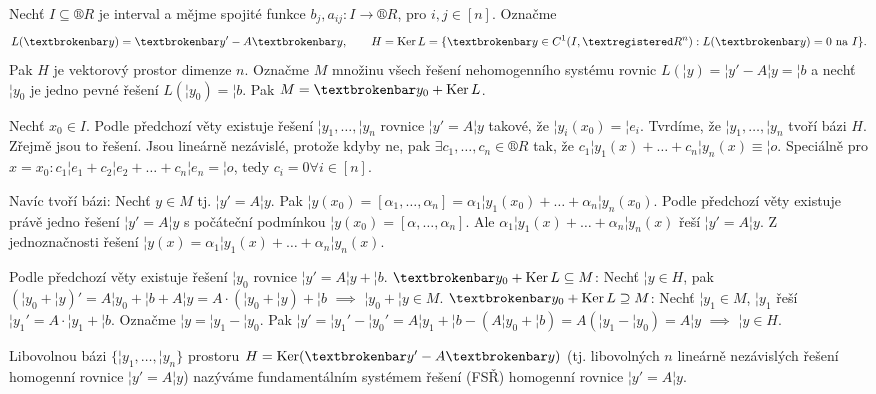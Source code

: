 \documentclass[12pt]{article}                   %
\begin{document}
        \begin{veta}
            Nechť $I \subseteq ®R$ je interval a mějme spojité funkce $b_j, a_{ij}: I \rightarrow ®R$, pro $i, j \in [n]$. Označme
            $$ L(¦y) = ¦y' - A¦y, \qquad H = \Ker L = \{¦y \in C^1(I, ®R^n) : L(¦y) = 0 \text{ na } I\}. $$
            Pak $H$ je vektorový prostor dimenze $n$. Označme $M$ množinu všech řešení nehomogenního systému rovnic $L(¦y) = ¦y' - A¦y = ¦b$ a nechť $¦y_0$ je jedno pevné řešení $L(¦y_0) = ¦b$. Pak $M = ¦y_0 + \Ker L$.

            \begin{dukazin}
                Nechť $x_0 \in I$. Podle předchozí věty existuje řešení $¦y_1, …, ¦y_n$ rovnice $¦y' = A¦y$ takové, že $¦y_i(x_0) = ¦e_i$. Tvrdíme, že $¦y_1, …, ¦y_n$ tvoří bázi $H$. Zřejmě jsou to řešení. Jsou lineárně nezávislé, protože kdyby ne, pak $\exists c_1, …, c_n \in ®R$ tak, že $c_1¦y_1(x) + … + c_n¦y_n(x) ≡ ¦o$. Speciálně pro $x = x_0: c_1¦e_1 + c_2¦e_2 + … + c_n¦e_n = ¦o$, tedy $c_i = 0 \forall i \in [n]$.

                Navíc tvoří bázi: Nechť $y \in M$ tj. $¦y' = A¦y$. Pak $¦y(x_0) = [\alpha_1, …, \alpha_n] = \alpha_1¦y_1(x_0) + … + \alpha_n¦y_n(x_0)$. Podle předchozí věty existuje právě jedno řešení $¦y' = A¦y$ s počáteční podmínkou $¦y(x_0) = [\alpha, …, \alpha_n]$. Ale $\alpha_1¦y_1(x) + … + \alpha_n¦y_n(x)$ řeší $¦y' = A¦y$. Z jednoznačnosti řešení $¦y(x) = \alpha_1¦y_1(x) + … + \alpha_n¦y_n(x)$.

                Podle předchozí věty existuje řešení $¦y_0$ rovnice $¦y' = A¦y + ¦b$. $¦y_0 + \Ker L \subseteq M$: Nechť $¦y \in H$, pak $(¦y_0 + ¦y)' = A¦y_0 + ¦b + A¦y = A·(¦y_0 + ¦y) + ¦b$ $\implies$ $¦y_0 + ¦y \in M$. $¦y_0 + \Ker L \supseteq M$: Nechť $¦y_1 \in M$, $¦y_1$ řeší $¦y_1' = A·¦y_1 + ¦b$. Označme $¦y = ¦y_1 - ¦y_0$. Pak $¦y' = ¦y_1' - ¦y_0' = A¦y_1 + ¦b - (A¦y_0 + ¦b) = A(¦y_1 - ¦y_0) = A¦y$ $\implies$ $¦y \in H$.
            \end{dukazin}
        \end{veta}

        \begin{definice}
            Libovolnou bázi $\{¦y_1, …, ¦y_n\}$ prostoru $H = \Ker(¦y' - A¦y)$ (tj. libovolných $n$ lineárně nezávislých řešení homogenní rovnice $¦y' = A¦y$) nazýváme fundamentálním systémem řešení (FSŘ) homogenní rovnice $¦y' = A¦y$.
        \end{definice}
    
\end{document}
